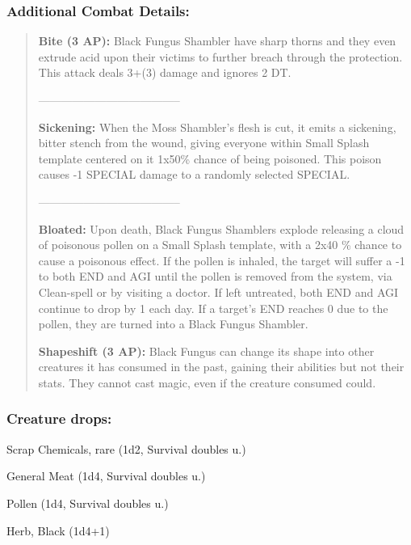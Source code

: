 \documentclass[11pt,a4paper,twocolumn]{book}
\begin{document}
	\subsubsection*{Additional Combat Details:}
	\begin{verse}
		\textbf{Bite (3 AP):} Black Fungus Shambler have sharp thorns and they even extrude acid upon their victims to further breach through the protection. This attack deals 3+(3) damage and ignores 2 DT.
		
		--------------------------------------
		
		\textbf{Sickening:} When the Moss Shambler's flesh is cut, it emits a sickening, bitter stench from the wound, giving everyone within Small Splash template centered on it 1x50\% chance of being poisoned. This poison causes -1 SPECIAL damage to a randomly selected SPECIAL.
		
		--------------------------------------
		
		\textbf{Bloated:} Upon death, Black Fungus Shamblers explode releasing a cloud of poisonous pollen on a Small Splash template, with a 2x40 \%  chance to cause a poisonous effect. If the pollen is inhaled, the target will suffer a -1 to both END and AGI until the pollen is removed from the system, via Clean-spell or by visiting a doctor. If left untreated, both END and AGI continue to drop by 1 each day. If a target's END reaches 0 due to the pollen, they are turned into a Black Fungus Shambler.
		
		\textbf{Shapeshift (3 AP):} Black Fungus can change its shape into other creatures it has consumed in the past, gaining their abilities but not their stats. They cannot cast magic, even if the creature consumed could.
%		
%		
%		
	\end{verse}
	
	\subsubsection*{Creature drops:}
	\begin{compactitem}
		\item Scrap Chemicals, rare (1d2, Survival doubles u.)
		\item General Meat (1d4, Survival doubles u.)
		\item Pollen (1d4, Survival doubles u.)
		\item Herb, Black (1d4+1)
	\end{compactitem}
	
\end{document}
